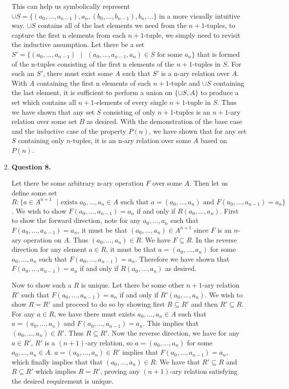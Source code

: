 \documentclass{article}
\begin{document}
\begin{enumerate}
				This can help us symbolically represent $\cup S = \{(a_0, ..., a_{n - 1}), a_n, (b_0, ..., b_{n - 1}), b_n, ...\}$ in a more visually intuitive way. $\cup S$ contains all of the last elements we need from the $n + 1$-tuples, to capture the first n elements from each $n + 1$-tuple, we simply need to revisit the inductive assumption. Let there be a set $S' = \{(a_0, ..., a_{n - 1}) \text{ } | \text{ } (a_0, ..., a_{n - 1}, a_n) \in S \text{ for some  } a_n\}$ that is formed of the n-tuples consisting of the first n elements of the $n + 1$-tuples in $S$. For such an $S'$, there must exist some $A$ such that $S'$ is a n-ary relation over $A$. With $A$ containing the first n elements of each $n+1$-tuple and $\cup S$ containing the last element, it is sufficient to perform a union on $\{\cup S, A\}$ to produce a set which contains all $n + 1$-elements of every single $n + 1$-tuple in $S$. Thus we have shown that any set $S$ consisting of only $n + 1$-tuples is an $n + 1$-ary relation over some set $B$ as desired. With the demonstration of the base case and the inductive case of the property $P(n)$, we have shown that for any set $S$ containing only $n$-tuples, it is an n-ary relation over some $A$ based on $P(n)$.
				
				
				\medskip
				\item \textbf{Question 8.}
				\medskip
				
				Let there be some arbitrary n-ary operation $F$ over some $A$. Then let us define some set $R: \{a \in A^{n + 1} \text{ } | \text{ exists } a_0, ..., a_n \in A \text{ such that } a = (a_0, ..., a_n) \text{ and } F(a_0, ..., a_{n - 1}) = a_n\}$. We wish to show $F(a_0, ..., a_{n - 1}) = a_n$ if and only if $R(a_0, ..., a_n)$. First to show the forward direction, note for any $a_0, ..., a_n$ such that $F(a_0, ..., a_{n - 1}) = a_n$, it must be that $(a_0, ..., a_n) \in A^{n + 1}$ since $F$ is an $n$-ary operation on $A$. Thus $(a_0, ..., a_n) \in R$. We have $F \subseteq R$. In the reverse direction for any element $a \in R$, it must be that $a = (a_0, ..., a_n)$ for some $a_0, ..., a_n$ such that $F(a_0, ..., a_{n - 1}) = a_{n}$. Therefore we have shown that $F(a_0, ..., a_{n - 1}) = a_n$ if and only if $R(a_0, ..., a_{n})$ as desired.
				
				\medskip
				Now to show such a $R$ is unique. Let there be some other $n + 1$-ary relation $R'$ such that $F(a_0, ..., a_{n - 1}) = a_n$ if and only if $R'(a_0, ..., a_{n})$. We wish to show $R = R'$ and proceed to do so by showing first $R \subseteq R'$ and then $R' \subseteq R$. For any $a \in R$, we have there must exists $a_0, ..., a_n \in A$ such that $a = (a_0, ..., a_n)$ and $F(a_0, ..., a_{n - 1}) = a_n$. This implies that $(a_0, ..., a_{n}) \in R'$. Thus $R \subseteq R'$. Now the reverse direction, we have for any $a \in R'$, $R'$ is a $(n + 1)$-ary relation, so $a = (a_0, ..., a_{n})$ for some $a_0, ..., a_n \in A$. $a = (a_0, ..., a_n) \in R'$ implies that $F(a_0, ..., a_{n - 1}) = a_n$, which finally implies that that $(a_0, ..., a_{n}) \in R$. We have that $R' \subseteq R$ and $R \subseteq R'$ which implies $R = R'$, proving any $(n + 1)$-ary relation satisfying the desired requirement is unique.
					

\end{enumerate}
\end{document}
